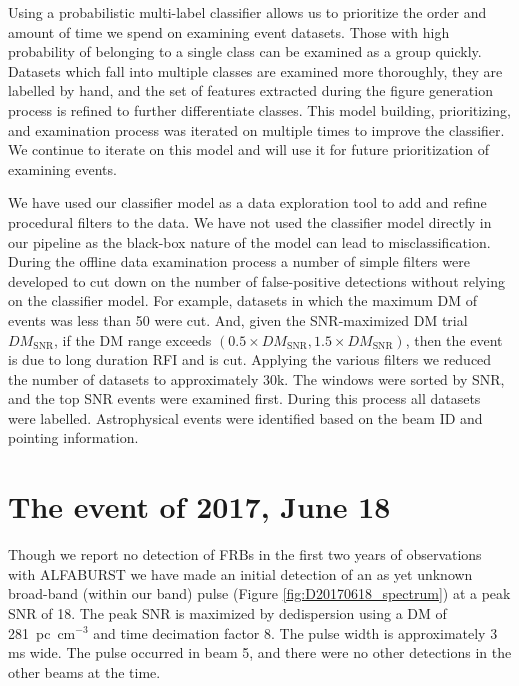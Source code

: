 \documentclass[a4paper,fleqn,usenatbib]{mnras}
\begin{document}
Using a probabilistic multi-label classifier allows us to prioritize
the order and amount of time we spend on examining event
datasets. Those with high probability of belonging to a single class
can be examined as a group quickly.  Datasets which fall into multiple
classes are examined more thoroughly, they are labelled by hand, and
the set of features extracted during the figure generation process is
refined to further differentiate classes. This model building,
prioritizing, and examination process was iterated on multiple times
to improve the classifier. We continue to iterate on this model and
will use it for future prioritization of examining events.

We have used our classifier model as a data exploration tool to add and refine
procedural filters to the data. We have not used the classifier model directly
in our pipeline as the black-box nature of the model can lead to
misclassification.  During the offline data examination process a number of
simple filters were developed to cut down on the number of false-positive
detections without relying on the classifier model. For example, datasets in
which the maximum DM of events was less than 50 were cut. And, given the
SNR-maximized DM trial $DM_{\textrm{SNR}}$, if the DM range exceeds $(0.5 \times
DM_{\textrm{SNR}}, 1.5 \times DM_{\textrm{SNR}})$, then the event is due to long
duration RFI and is cut.  Applying the various filters we reduced the number of
datasets to approximately 30k. The windows were sorted by SNR, and the top SNR
events were examined first.  During this process all datasets were labelled.
Astrophysical events were identified based on the beam ID and pointing
information.


\section{The event of 2017, June 18}
\label{sec:18062017}

Though we report no detection of FRBs in the first two years of
observations with ALFABURST we have made an initial detection of an as
yet unknown broad-band (within our band) pulse (Figure
\ref{fig:D20170618_spectrum}) at a peak SNR of 18. The peak SNR is
maximized by dedispersion using a DM of 281~pc~cm$^{-3}$ and time
decimation factor 8. The pulse width is approximately 3 ms wide. The
pulse occurred in beam 5, and there were no other detections in the
other beams at the time.
\end{document}
